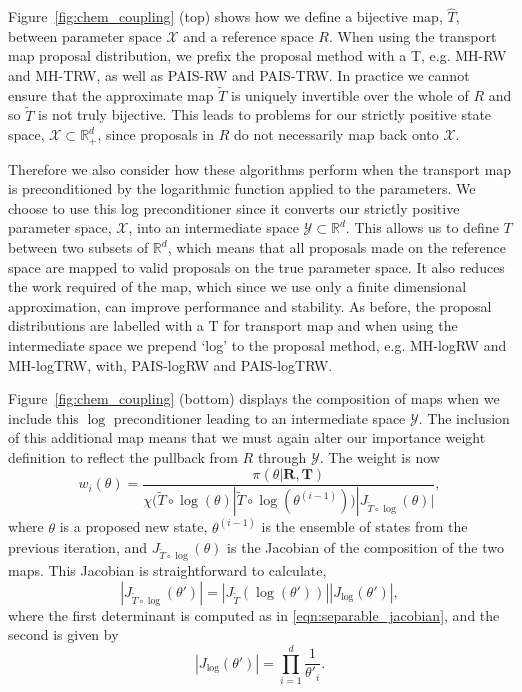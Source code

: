 \documentclass[final]{siamltex}
\begin{document}
Figure~\ref{fig:chem_coupling} (top) shows how we define a bijective map,
$\hat{T}$, between parameter space $\mathcal{X}$ and a reference space
$R$. When using the transport map proposal distribution, we prefix the proposal method with a T, e.g. MH-RW  and MH-TRW, as well as PAIS-RW and PAIS-TRW. In practice we cannot ensure that the approximate map $\tilde{T}$
is uniquely invertible over the whole of $R$ and so $\tilde{T}$ is not
truly bijective. This leads to problems for our strictly positive
state space, $\mathcal{X} \subset \mathbb{R}_+^d$, since proposals in
$R$ do not necessarily map back onto $\mathcal{X}$.

Therefore we also consider how these algorithms perform when the transport map
is preconditioned by the logarithmic function applied to the parameters. We choose to use this log
preconditioner since it converts our strictly positive parameter
space, $\mathcal{X}$, into an intermediate space $\mathcal{Y} \subset
\mathbb{R}^d$. This allows us to define $T$ between two subsets of
$\mathbb{R}^d$, which means that all proposals made on the reference
space are mapped to valid
proposals on the true parameter space. It also reduces the work required of the map, which since
we use only a finite dimensional approximation, can improve
performance and stability. As before, the proposal distributions are labelled with a T for transport map and when using the intermediate space we prepend `log' to the proposal method, e.g. MH-logRW and MH-logTRW, with, PAIS-logRW and PAIS-logTRW.

Figure~\ref{fig:chem_coupling} (bottom) displays the composition of maps
when we include this $\log$ preconditioner leading to an intermediate space $\mathcal{Y}$. The inclusion of this additional map means that we must again alter our importance weight definition to reflect the pullback from $R$ through $\mathcal{Y}$. The weight is now
\[
	w_i(\theta) = \frac{\pi(\theta|\mathbf{R},\mathbf{T})}{\chi(\tilde{T}\circ\log(\theta)|\tilde{T}\circ\log(\theta^{(i-1)}))|J_{\tilde{T}\circ\log}(\theta)|},
\]
where $\theta$ is a proposed new state, $\theta^{(i-1)}$ is the ensemble of states from the previous iteration, and $J_{\tilde{T}\circ\log}(\theta)$ is the Jacobian of the composition of the two maps. This Jacobian is straightforward to calculate,
\[
	|J_{\tilde{T}\circ\log}(\theta')| = |J_{\tilde{T}}(\log(\theta'))||J_{\log}(\theta')|,
\]
where the first determinant is computed as in
\eqref{eqn:separable_jacobian}, and the second is given by
\[
	|J_{\log}(\theta')| = \prod\limits_{i=1}^d \frac{1}{\theta'_i}.
\]
\end{document}

